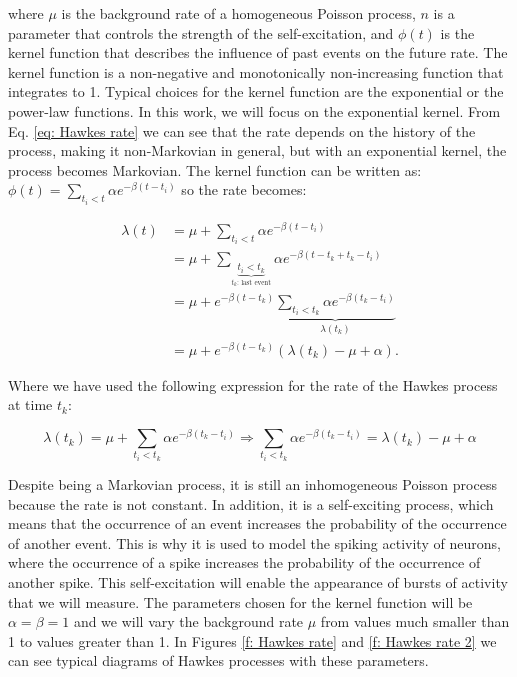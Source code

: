 where $\mu$ is the background rate of a homogeneous Poisson process, $n$ is a parameter that controls the strength of the self-excitation, and $\phi(t)$ is the kernel function that
describes the influence of past events on the future rate. The kernel function is a non-negative and monotonically non-increasing function that integrates to 1.
Typical choices for the kernel function are the exponential or the power-law functions. In this work, we will focus on the exponential kernel. 
From Eq. \ref{eq: Hawkes rate} we can see that the rate depends on the history of the process, making it non-Markovian in general, but with an exponential kernel, the process becomes
Markovian. The kernel function can be written as: $\phi(t)=\sum_{t_i<t}\alpha e^{-\beta(t-t_i)}$ so the rate becomes:

\begin{equation}
    \begin{split}
        \lambda(t) &= \mu + \sum_{t_i<t}\alpha e^{-\beta(t-t_i)}\\
        &= \mu + \sum_{\underbrace{t_i<t_k}_{t_k\text{: last event}}}\alpha e^{-\beta(t-t_k+t_k-t_i)}\\
        &= \mu + e^{-\beta(t-t_k)}\underbrace{\sum_{t_i<t_k}\alpha e^{-\beta(t_k-t_i)}}_{\lambda(t_k)}\\
        &= \mu + e^{-\beta(t-t_k)}\left( \lambda(t_k)-\mu+\alpha \right).
    \end{split}
    \label{eq: Hawkes rate exponential becomes Markovian}
\end{equation}

Where we have used the following expression for the rate of the Hawkes process at time $t_k$:

\begin{equation}
    \lambda(t_k) =\mu+\sum_{t_i<t_k}\alpha e^{-\beta(t_k-t_i)}\Rightarrow\sum_{t_i<t_k}\alpha e^{-\beta(t_k-t_i)} = \lambda(t_k)-\mu+\alpha
    \label{eq: Hawkes rate at event time}
\end{equation}

Despite being a Markovian process, it is still an inhomogeneous Poisson process because the rate is not constant. In addition, it is a self-exciting process, which means that the occurrence
of an event increases the probability of the occurrence of another event. This is why it is used to model the spiking activity of neurons, where the occurrence of a spike increases the
probability of the occurrence of another spike. This self-excitation will enable the appearance of bursts of activity that we will measure. The parameters chosen for the kernel function 
will be $\alpha=\beta=1$ and we will vary the background rate $\mu$ from values much smaller than 1 to values greater than 1. In Figures \ref{f: Hawkes rate} and \ref{f: Hawkes rate 2}
we can see typical diagrams of Hawkes processes with these parameters.

